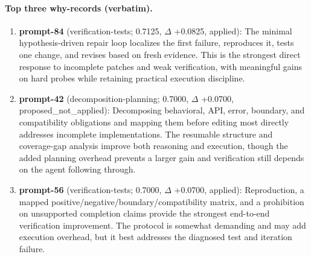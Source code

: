 \paragraph{Top three why-records (verbatim).}\begin{enumerate}\itemsep1pt
\item \textbf{prompt-84} (verification-tests; 0.7125, $\Delta$ +0.0825, applied): The minimal hypothesis-driven repair loop localizes the first failure, reproduces it, tests one change, and revises based on fresh evidence. This is the strongest direct response to incomplete patches and weak verification, with meaningful gains on hard probes while retaining practical execution discipline.
\item \textbf{prompt-42} (decomposition-planning; 0.7000, $\Delta$ +0.0700, proposed\_not\_applied): Decomposing behavioral, API, error, boundary, and compatibility obligations and mapping them before editing most directly addresses incomplete implementations. The resumable structure and coverage-gap analysis improve both reasoning and execution, though the added planning overhead prevents a larger gain and verification still depends on the agent following through.
\item \textbf{prompt-56} (verification-tests; 0.7000, $\Delta$ +0.0700, applied): Reproduction, a mapped positive/negative/boundary/compatibility matrix, and a prohibition on unsupported completion claims provide the strongest end-to-end verification improvement. The protocol is somewhat demanding and may add execution overhead, but it best addresses the diagnosed test and iteration failure.
\end{enumerate}
